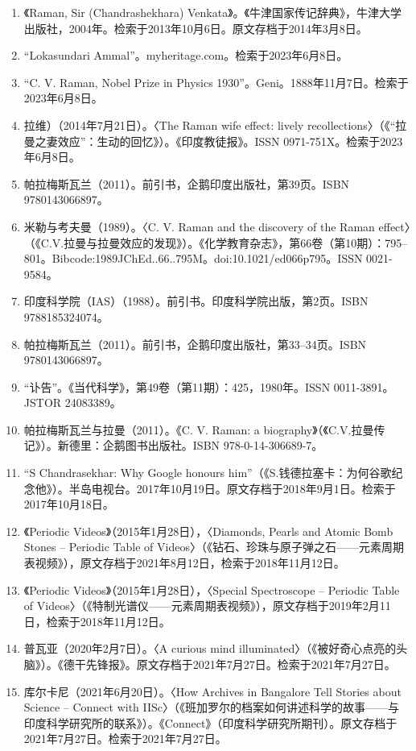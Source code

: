 \begin{enumerate}
\item 《Raman, Sir (Chandrashekhara) Venkata》。《牛津国家传记辞典》，牛津大学出版社，2004年。检索于2013年10月6日。原文存档于2014年3月8日。
\item “Lokasundari Ammal”。myheritage.com。检索于2023年6月8日。
\item “C. V. Raman, Nobel Prize in Physics 1930”。Geni。1888年11月7日。检索于2023年6月8日。
\item 拉维）（2014年7月21日）。〈The Raman wife effect: lively recollections〉（《“拉曼之妻效应”：生动的回忆》）。《印度教徒报》。ISSN 0971-751X。检索于2023年6月8日。
\item 帕拉梅斯瓦兰（2011）。前引书，企鹅印度出版社，第39页。ISBN 9780143066897。
\item 米勒与考夫曼（1989）。〈C. V. Raman and the discovery of the Raman effect〉（《C.V.拉曼与拉曼效应的发现》）。《化学教育杂志》，第66卷（第10期）：795–801。Bibcode:1989JChEd..66..795M。doi:10.1021/ed066p795。ISSN 0021-9584。
\item 印度科学院（IAS）（1988）。前引书。印度科学院出版，第2页。ISBN 9788185324074。
\item 帕拉梅斯瓦兰（2011）。前引书，企鹅印度出版社，第33–34页。ISBN 9780143066897。
\item “讣告”。《当代科学》，第49卷（第11期）：425，1980年。ISSN 0011-3891。JSTOR 24083389。
\item 帕拉梅斯瓦兰与拉曼（2011）。《C. V. Raman: a biography》（《C.V.拉曼传记》）。新德里：企鹅图书出版社。ISBN 978-0-14-306689-7。
\item “S Chandrasekhar: Why Google honours him”（《S.钱德拉塞卡：为何谷歌纪念他》）。半岛电视台。2017年10月19日。原文存档于2018年9月1日。检索于2017年10月18日。
\item 《Periodic Videos》（2015年1月28日），〈Diamonds, Pearls and Atomic Bomb Stones – Periodic Table of Videos〉（《钻石、珍珠与原子弹之石——元素周期表视频》），原文存档于2021年8月12日，检索于2018年11月12日。
\item 《Periodic Videos》（2015年1月28日），〈Special Spectroscope – Periodic Table of Videos〉（《特制光谱仪——元素周期表视频》），原文存档于2019年2月11日，检索于2018年11月12日。
\item 普瓦亚（2020年2月7日）。〈A curious mind illuminated〉（《被好奇心点亮的头脑》）。《德干先锋报》。原文存档于2021年7月27日。检索于2021年7月27日。
\item 库尔卡尼（2021年6月20日）。〈How Archives in Bangalore Tell Stories about Science – Connect with IISc〉（《班加罗尔的档案如何讲述科学的故事——与印度科学研究所的联系》）。《Connect》（印度科学研究所期刊）。原文存档于2021年7月27日。检索于2021年7月27日。

\end{enumerate}

